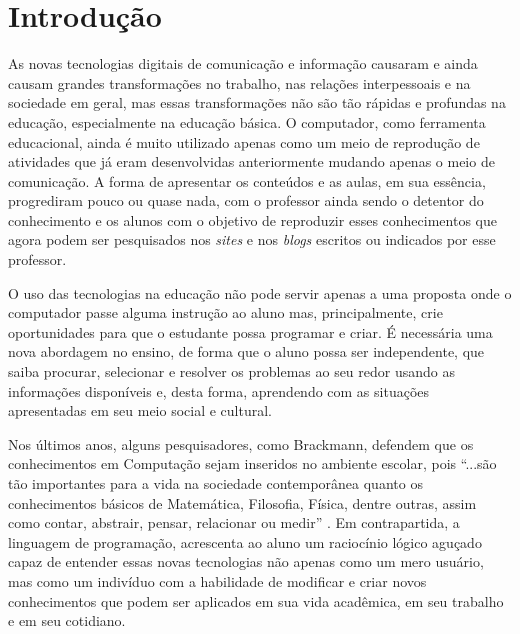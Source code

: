 \documentclass[12pt, openright, a4paper, brazil, english, french, spanish, bibjustif, openany, oneside]{abntex2}
\begin{document}
\tableofcontents*
\cleardoublepage
\textual


\chapter*[Introdução]{Introdução}

As novas tecnologias digitais de comunicação e informação causaram e ainda causam grandes transformações no trabalho, nas relações interpessoais e na sociedade em geral, mas essas transformações não são tão rápidas e profundas na educação, especialmente na educação básica. O computador, como ferramenta educacional, ainda é muito utilizado apenas como um meio de reprodução de atividades que já eram desenvolvidas anteriormente mudando apenas o meio de comunicação. A forma de apresentar os conteúdos e as aulas, em sua essência, progrediram pouco ou quase nada, com o professor ainda sendo o detentor do conhecimento e os alunos com o objetivo de reproduzir esses conhecimentos que agora podem ser pesquisados nos \textit{sites} e nos \textit{blogs} escritos ou indicados por esse professor.


O uso das tecnologias na educação não pode servir apenas a uma proposta onde o computador passe alguma instrução ao aluno mas, principalmente, crie oportunidades para que o estudante possa programar e criar. É necessária uma nova abordagem no ensino, de forma que o aluno possa ser independente, que saiba procurar, selecionar e resolver os problemas ao seu redor usando as informações disponíveis e, desta forma, aprendendo com as situações apresentadas em seu meio social e cultural. 

Nos últimos anos, alguns pesquisadores, como Brackmann, defendem que os conhecimentos em Computação sejam inseridos no ambiente escolar, pois ``...são tão importantes para a vida na sociedade contemporânea quanto os conhecimentos básicos de Matemática, Filosofia, Física, dentre outras, assim como contar, abstrair, pensar, relacionar ou medir'' \cite{brac}. Em contrapartida, a linguagem de programação, acrescenta ao aluno um raciocínio lógico aguçado capaz de entender essas novas tecnologias não apenas como um mero usuário, mas como um indivíduo com a habilidade de modificar e criar novos conhecimentos que podem ser aplicados em sua vida acadêmica, em seu trabalho e em seu cotidiano.
\end{document}
